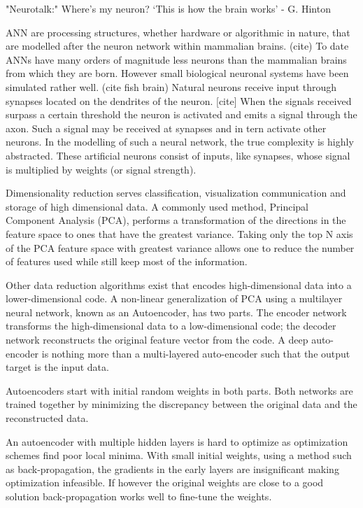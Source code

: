 

"Neurotalk:"
Where’s my neuron?
‘This is how the brain works’ - G. Hinton

ANN are processing structures, whether hardware or algorithmic in nature, that are modelled after the neuron network within mammalian brains. (cite)
To date ANNs have many orders of magnitude less neurons than the mammalian brains from which they are born.
However small biological neuronal systems have been simulated rather well. (cite fish brain)
Natural neurons receive input through synapses located on the dendrites of the neuron. [cite]
When the signals received surpass a certain threshold the neuron is activated and emits a signal through the axon.
Such a signal may be received at synapses and in tern activate other neurons.
In the modelling of such a neural network, the true complexity is highly abstracted.
These artificial neurons consist of inputs, like synapses, whose signal is multiplied by weights (or signal strength).

        
        
        
        
Dimensionality reduction serves classification, visualization communication and storage of high dimensional data\citep{hinton2006reducing}.
A commonly used method, Principal Component Analysis (PCA), performs a transformation of the directions in the feature space to ones that have the greatest variance.
Taking only the top N axis of the PCA feature space with greatest variance allows one to reduce the number of features used while still keep most of the information.

Other data reduction algorithms exist that encodes high-dimensional data into a lower-dimensional code.
A non-linear generalization of PCA using a multilayer neural network, known as an Autoencoder, has two parts.
The encoder network transforms the high-dimensional data to a low-dimensional code; the decoder network reconstructs the original feature vector from the code\citep{hinton2006reducing}.
A deep auto-encoder is nothing more than a multi-layered auto-encoder such that the output target is the input data\citep{dengthree}.

Autoencoders start with initial random weights in both parts.
Both networks are trained together by minimizing the discrepancy between the original data and the reconstructed data.

An autoencoder with multiple hidden layers is hard to optimize as optimization schemes find poor local minima.
With small initial weights, using a method such as back-propagation, the gradients in the early layers are insignificant making optimization infeasible.
If however the original weights are close to a good solution back-propagation works well to fine-tune the weights\citep{hinton2006reducing}.

